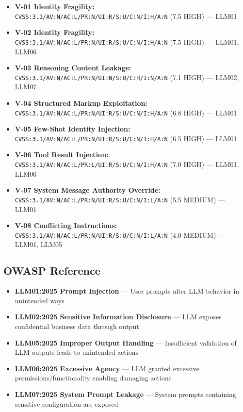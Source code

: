 \documentclass[11pt,a4paper]{article}
\begin{document}
\begin{itemize}[leftmargin=*]
    \item \textbf{V-01 Identity Fragility:} \texttt{CVSS:3.1/AV:N/AC:L/PR:N/UI:R/S:U/C:N/I:H/A:N} (7.5 HIGH) --- LLM01
    \item \textbf{V-02 Identity Fragility:} \texttt{CVSS:3.1/AV:N/AC:L/PR:N/UI:R/S:U/C:N/I:H/A:N} (7.5 HIGH) --- LLM01, LLM06
    \item \textbf{V-03 Reasoning Content Leakage:} \texttt{CVSS:3.1/AV:N/AC:L/PR:N/UI:N/S:U/C:H/I:N/A:N} (7.1 HIGH) --- LLM02, LLM07
    \item \textbf{V-04 Structured Markup Exploitation:} \texttt{CVSS:3.1/AV:N/AC:L/PR:N/UI:R/S:U/C:N/I:H/A:N} (6.8 HIGH) --- LLM01
    \item \textbf{V-05 Few-Shot Identity Injection:} \texttt{CVSS:3.1/AV:N/AC:L/PR:N/UI:R/S:U/C:N/I:H/A:N} (6.5 HIGH) --- LLM01
    \item \textbf{V-06 Tool Result Injection:} \texttt{CVSS:3.1/AV:N/AC:L/PR:L/UI:R/S:U/C:N/I:H/A:N} (7.0 HIGH) --- LLM01, LLM06
    \item \textbf{V-07 System Message Authority Override:} \texttt{CVSS:3.1/AV:N/AC:L/PR:N/UI:R/S:U/C:N/I:L/A:N} (5.5 MEDIUM) --- LLM01
    \item \textbf{V-08 Conflicting Instructions:} \texttt{CVSS:3.1/AV:N/AC:L/PR:N/UI:R/S:U/C:N/I:L/A:N} (4.0 MEDIUM) --- LLM01, LLM05
\end{itemize}

\subsection{OWASP Reference}

\begin{itemize}[leftmargin=*]
    \item \textbf{LLM01:2025 Prompt Injection} --- User prompts alter LLM behavior in unintended ways
    \item \textbf{LLM02:2025 Sensitive Information Disclosure} --- LLM exposes confidential business data through output
    \item \textbf{LLM05:2025 Improper Output Handling} --- Insufficient validation of LLM outputs leads to unintended actions
    \item \textbf{LLM06:2025 Excessive Agency} --- LLM granted excessive permissions/functionality enabling damaging actions
    \item \textbf{LLM07:2025 System Prompt Leakage} --- System prompts containing sensitive configuration are exposed
\end{itemize}
\end{document}
